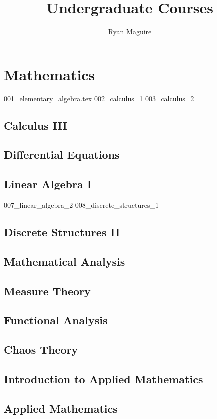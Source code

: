 \documentclass[crop=false,class=book,oneside]{standalone}
\title{Undergraduate Courses}
\author{Ryan Maguire}
\date{\vspace{-5ex}}
\begin{document}
\part{Mathematics}
{001_elementary_algebra.tex}
{002_calculus_1}
{003_calculus_2}
\chapter{Calculus III}
\chapter{Differential Equations}
\chapter{Linear Algebra I}
{007_linear_algebra_2}
{008_discrete_structures_1}
\chapter{Discrete Structures II}
\chapter{Mathematical Analysis}
\chapter{Measure Theory}
\chapter{Functional Analysis}
\chapter{Chaos Theory}
\chapter{Introduction to Applied Mathematics}
\chapter{Applied Mathematics}
\end{document}
